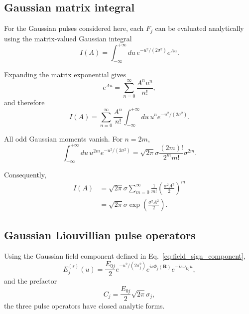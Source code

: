 \documentclass[11pt]{article}
\begin{document}
\subsection{Gaussian matrix integral}
\label{subsec:gaussian_matrix_integral}

For the Gaussian pulses considered here, each $F_j$ can be evaluated
analytically using the matrix-valued Gaussian integral
%
\begin{equation}
I(A)
=
\int_{-\infty}^{+\infty}
du\,
e^{-u^2/(2\sigma^2)}
e^{Au}.
\label{eq:matrix_gaussian_integral}
\end{equation}

Expanding the matrix exponential gives
%
\begin{equation}
e^{Au}
=
\sum_{n=0}^{\infty}
\frac{A^n u^n}{n!},
\end{equation}
%
and therefore
%
\begin{equation}
I(A)
=
\sum_{n=0}^{\infty}
\frac{A^n}{n!}
\int_{-\infty}^{+\infty}
du\,
u^n e^{-u^2/(2\sigma^2)}.
\end{equation}

All odd Gaussian moments vanish. For $n=2m$,
%
\begin{equation}
\int_{-\infty}^{+\infty}
du\,
u^{2m}
e^{-u^2/(2\sigma^2)}
=
\sqrt{2\pi}\sigma
\frac{(2m)!}{2^m m!}
\sigma^{2m}.
\end{equation}

Consequently,
%
\begin{align}
I(A)
&=
\sqrt{2\pi}\sigma
\sum_{m=0}^{\infty}
\frac{1}{m!}
\left(
\frac{\sigma^2A^2}{2}
\right)^m
\\
&=
\boxed{
\sqrt{2\pi}\sigma
\exp
\left(
\frac{\sigma^2A^2}{2}
\right).
}
\label{eq:matrix_gaussian_identity}
\end{align}


\subsection{Gaussian Liouvillian pulse operators}
\label{subsec:gaussian_F_operators}

Using the Gaussian field component defined in
Eq.~\eqref{eq:field_sign_component},
%
\begin{equation}
E_j^{(s)}(u)
=
\frac{E_{0j}}{2}
e^{-u^2/(2\sigma_j^2)}
e^{is\Phi_j(\mathbf{R})}
e^{-is\omega_{Lj}u},
\end{equation}
%
and the prefactor
%
\begin{equation}
C_j
=
\frac{E_{0j}}{2}
\sqrt{2\pi}\sigma_j,
\end{equation}
%
the three pulse operators have closed analytic forms.
\end{document}
